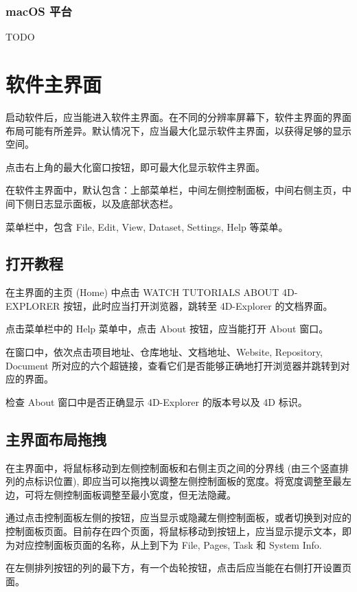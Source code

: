 \documentclass[a4paper,12pt]{report}	%
\begin{document}
\subsection{macOS 平台}

TODO

\chapter{软件主界面}

启动软件后，应当能进入软件主界面。在不同的分辨率屏幕下，软件主界面的界面布局可能有所差异。默认情况下，应当最大化显示软件主界面，以获得足够的显示空间。

点击右上角的最大化窗口按钮，即可最大化显示软件主界面。

在软件主界面中，默认包含：上部菜单栏，中间左侧控制面板，中间右侧主页，中间下侧日志显示面板，以及底部状态栏。

菜单栏中，包含 File, Edit, View, Dataset, Settings, Help 等菜单。

\section{打开教程}

在主界面的主页 (Home) 中点击 WATCH TUTORIALS ABOUT 4D-EXPLORER 按钮，此时应当打开浏览器，跳转至 4D-Explorer 的文档界面。

点击菜单栏中的 Help 菜单中，点击 About 按钮，应当能打开 About 窗口。

在窗口中，依次点击项目地址、仓库地址、文档地址、Website, Repository, Document 所对应的六个超链接，查看它们是否能够正确地打开浏览器并跳转到对应的界面。

检查 About 窗口中是否正确显示 4D-Explorer 的版本号以及 4D 标识。

\section{主界面布局拖拽}

在主界面中，将鼠标移动到左侧控制面板和右侧主页之间的分界线 (由三个竖直排列的点标识位置), 即应当可以拖拽以调整左侧控制面板的宽度。将宽度调整至最左边，可将左侧控制面板调整至最小宽度，但无法隐藏。

通过点击控制面板左侧的按钮，应当显示或隐藏左侧控制面板，或者切换到对应的控制面板页面。目前存在四个页面，将鼠标移动到按钮上，应当显示提示文本，即为对应控制面板页面的名称，从上到下为 File, Pages, Task 和 System Info. 

在左侧排列按钮的列的最下方，有一个齿轮按钮，点击后应当能在右侧打开设置页面。
\end{document}

